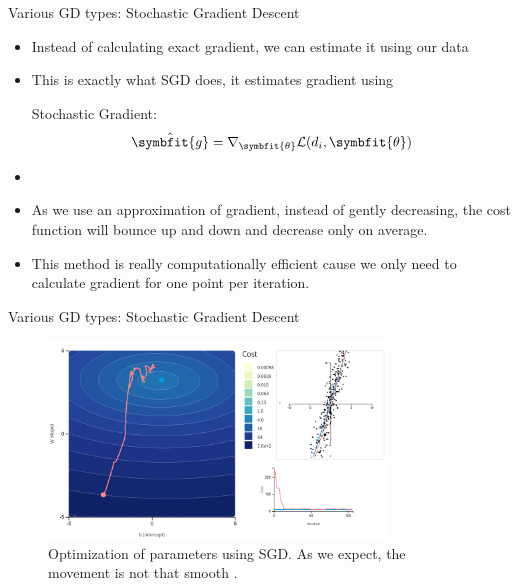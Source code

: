 \begin{frame}{Various GD types: Stochastic Gradient Descent}
	\begin{itemize}
		\item Instead of calculating exact gradient, we can estimate it using our data
		\item This is exactly what SGD does, it estimates gradient using 
		\begin{block}{Stochastic Gradient:}
			\[
			\hat{\symbfit{g}} = \nabla_{\symbfit{\theta}} \mathcal{L}(d_i, \symbfit{\theta})
			\]
		\end{block}
		\item[]
		\item As we use an approximation of gradient, instead of gently decreasing, the cost function will bounce up and down and decrease only on average.
		\item This method is really computationally efficient cause we only need to calculate gradient for one point per iteration. 
	\end{itemize}
\end{frame}

\begin{frame}{Various GD types: Stochastic Gradient Descent}
	\begin{figure}[H]
		\centering
		\includegraphics[width=0.8\textwidth]{Images/sgd.png}
		\caption{Optimization of parameters using SGD. As we expect, the movement is not that smooth \cite{katanforoosh-kunin-opt}.}
	\end{figure} 
\end{frame}

